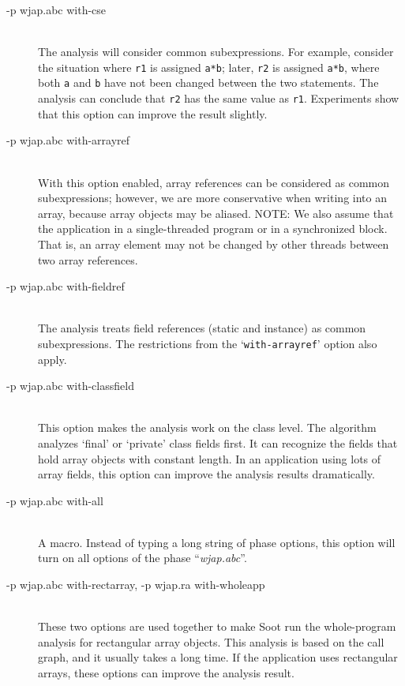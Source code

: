\documentclass{article}
\begin{document}
\begin{description}

\item[-p wjap.abc with-cse]\ \\ 
The analysis will consider common subexpressions.  For example,
  consider the situation where {\tt r1} is assigned {\tt a*b}; later,
  {\tt r2} is assigned {\tt a*b}, where both {\tt a} and {\tt b} have
  not been changed between the two statements. The analysis can
  conclude that {\tt r2} has the same value as {\tt r1}. Experiments
  show that this option can improve the result slightly.

\item[-p wjap.abc with-arrayref]\ \\ With this option enabled, array
references can be considered as common subexpressions; however, we are
more conservative when writing into an array, because array
objects may be aliased. NOTE: We also assume that the application in a
single-threaded program or in a synchronized block. That is, an
array element may not be changed by other threads between two array
references.

\item[-p wjap.abc with-fieldref]\ \\ 
The analysis treats field references (static and instance) as common
subexpressions. The restrictions from the `{\tt with-arrayref}' option also
apply. 

\item[-p wjap.abc with-classfield]\ \\ 
This option makes the analysis work on the class level. The algorithm 
analyzes `final' or `private' class fields first. It can recognize
the fields that hold array objects with constant length.  In an application 
using lots of array fields, this option can improve the analysis results 
dramatically. 

\item[-p wjap.abc with-all]\ \\
A macro.  Instead of typing a long string of phase options, this option 
will turn on all options of the phase ``{\em wjap.abc}''.
 
\item[-p wjap.abc with-rectarray, -p wjap.ra with-wholeapp]\ \\ These
two options are used together to make Soot run the whole-program
analysis for rectangular array objects. This analysis is based on the
call graph, and it usually takes a long time. If the application uses
rectangular arrays, these options can improve the analysis
result.

\end{description}
\end{document}
